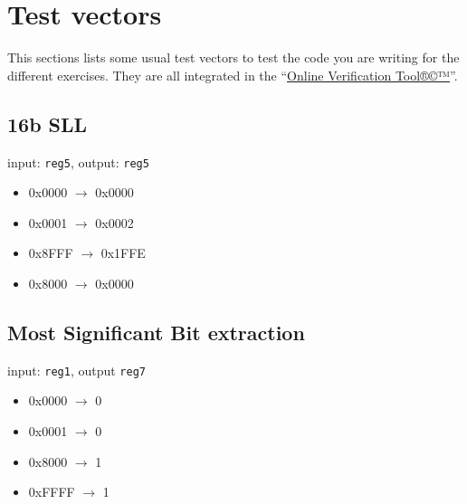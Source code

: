 \documentclass[10pt,a4paper]{article}
\theoremstyle{definition}%
\newcommand{\ovt}{\href{http://164.15.75.7:80}{Online Verification Tool®©™}}
\begin{document}
\newpage

\section{Test vectors}
\label{sec:vectors}
This sections lists some usual test vectors to test the code you are writing for the different exercises. They are all integrated in the ``\ovt''.
\subsection{16b SLL}
input: \verb!reg5!, output: \verb!reg5!
{\ttfamily
\begin{itemize}
\item 0x0000 $\longrightarrow$ 0x0000
\item 0x0001 $\longrightarrow$ 0x0002
\item 0x8FFF $\longrightarrow$ 0x1FFE
\item 0x8000 $\longrightarrow$ 0x0000
\end{itemize}}
\subsection{Most Significant Bit extraction}
input: \verb!reg1!, output \verb!reg7!
{\ttfamily
\begin{itemize}
\item 0x0000  $\longrightarrow$ 0
\item 0x0001  $\longrightarrow$ 0
\item 0x8000 $\longrightarrow$ 1
\item 0xFFFF $\longrightarrow$ 1
\end{itemize}}
\end{document}
